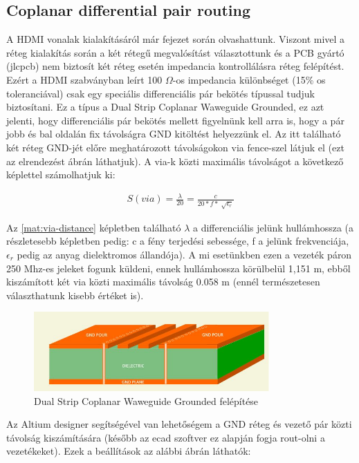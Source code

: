 	\subsection{Coplanar differential pair routing}
	
	A HDMI vonalak kialakításáról már  fejezet során olvashattunk. Viszont mivel a réteg kialakítás során a két rétegű megvalósítást választottunk és a PCB gyártó (jlcpcb) nem biztosít két réteg esetén impedancia kontrollálásra réteg felépítést. Ezért a HDMI szabványban leírt 100 $\Omega$-os impedancia különbséget (15\% os toleranciával) csak egy speciális differenciális pár bekötés típussal tudjuk biztosítani. Ez a típus a Dual Strip Coplanar Waweguide Grounded, ez azt jelenti, hogy differenciális pár bekötés mellett figyelnünk kell arra is, hogy a pár jobb és bal oldalán fix távolságra GND kitöltést helyezzünk el. Az itt található két réteg GND-jét előre meghatározott távolságokon via fence-szel látjuk el (ezt az elrendezést  ábrán láthatjuk). A via-k közti maximális távolságot a következő képlettel számolhatjuk ki:
	
	\begin{align}
		\label{mat:via-distance}	
		S(via) = \frac{\lambda}{20} = \frac{c}{20 * f * \sqrt[]{\epsilon_r}}
	\end{align}   
	
	Az \ref{mat:via-distance} képletben található $\lambda$ a differenciális jelünk hullámhossza (a részletesebb képletben pedig: c a fény terjedési sebessége, f a jelünk frekvenciája, $\epsilon_r$ pedig az anyag dielektromos állandója). A mi esetünkben ezen a vezeték páron 250 Mhz-es jeleket fogunk küldeni, ennek hullámhossza körülbelül 1,151 m, ebből kiszámított két via közti maximális távolság 0.058 m (ennél természetesen választhatunk kisebb értéket is).
	
	\begin{figure}[H]
		\centering
		\includegraphics[width=90mm, keepaspectratio]{figures/coplanar}
		\caption{Dual Strip Coplanar Waweguide Grounded felépítése} 
		\label{fig:coplanar}
	\end{figure}
	
	Az Altium designer segítségével van lehetőségem a GND réteg és vezető pár közti távolság kiszámítására (később az ecad szoftver ez alapján fogja rout-olni a vezetékeket). Ezek a beállítások az alábbi ábrán láthatók:      
	
